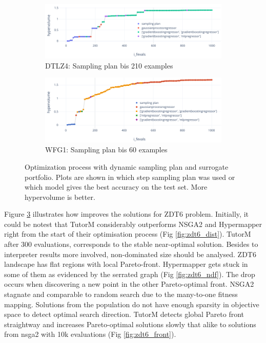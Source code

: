     \begin{figure}
        \centering
        \begin{subfigure}{\textwidth}
            \includegraphics[width=\textwidth]{content/images/dtlz4_models}
            \caption{DTLZ4: Sampling plan bis 210 examples}
            \label{fig:dtlz4_models_210}
        \end{subfigure}
        
        \begin{subfigure}{\textwidth}
            \includegraphics[width=\textwidth]{content/images/wfg1_models}
            \caption{WFG1: Sampling plan bis 60 examples}
            \label{fig:wfg1_models_60}
        \end{subfigure} 

        \caption[Optimization process with dynamic sampling plan and surrogate portfolio.]{Optimization process with dynamic sampling plan and surrogate portfolio. Plots are shown in which step sampling plan was used or which model gives the best accuracy on the test set. More hypervolume is better.}
        \label{fig:changing_models}    
    \end{figure}


    Figure \ref{fig:changing_models} illustrates how improves the solutions for ZDT6 problem. Initially, it could be notest that TutorM considerably outperforms NSGA2 and Hypermapper right from the start of their optimisation process (Fig \ref{fig:zdt6_dist}). TutorM after 300 evaluations, corresponds to the stable near-optimal solution. Besides to interpreter results more involved, non-dominated size should be analysed. ZDT6 landscape has flat regions with local Pareto-front. Hypermapper gets stuck in some of them as evidenced by the serrated graph (Fig \ref{fig:zdt6_ndf}). The drop occurs when discovering a new point in the other Pareto-optimal front. NSGA2 stagnate and comparable to random search due to the many-to-one fitness mapping. Solutions from the population do not have enough sparsity in objective space to detect optimal search direction. TutorM detects global Pareto front straightway and increases Pareto-optimal solutions slowly that alike to solutions from nsga2 with 10k evaluations (Fig \ref{fig:zdt6_front}).

